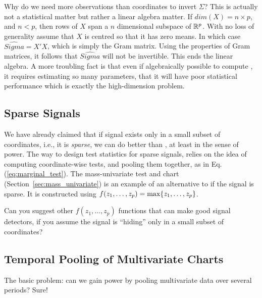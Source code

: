 \begin{extra}
Why do we need more observations than coordinates to invert $\Sigma$? 
This is actually not a statistical matter but rather a linear algebra matter.
If $dim(X)=n \times p$, and $n<p$, then rows of $X$ span a $n$ dimensional subspace of $\mathbb{R}^p$. 
With no loss of generality assume that $X$ is centred so that it has zero means. 
In which case $\hat{Sigma}=X'X$, which is simply the Gram matrix. 
Using the properties of Gram matrices, it follows that $\hat{Sigma}$ will not be invertible. 
This ends the linear algebra. A more troubling fact is that even if algebraically possible to compute \tsq, it requires estimating so many parameters, that it will have poor statistical performance \citep{bai_effect_1996} which is exactly the high-dimension problem. 
\end{extra}



\subsection{Sparse Signals}

We have already claimed that if signal exists only in a small subset of coordinates, i.e., it is \emph{sparse}, we can do better than \tsq, at least in the sense of power.
The way to design test statistics for sparse signals, relies on the idea of computing coordinate-wise tests, and pooling them together, as in Eq.(\ref{eq:marginal_test}). 
The mass-univariate test and chart (Section~\ref{sec:mass_univariate}) is an example of an alternative to \tsq if the signal is sparse. 
It is constructed using 
$f(z_1,\dots,z_p)=\max\{ z_1,\dots,z_p \}$.


\begin{think}
Can you suggest other $f(z_1,\dots,z_p)$ functions that can make good signal detectors, if you assume the signal is ``hiding'' only in a small subset of coordinates?
\end{think}











\subsection{Temporal Pooling of Multivariate Charts}
The basic problem: can we gain power by pooling multivariate data over several periods?
Sure!

